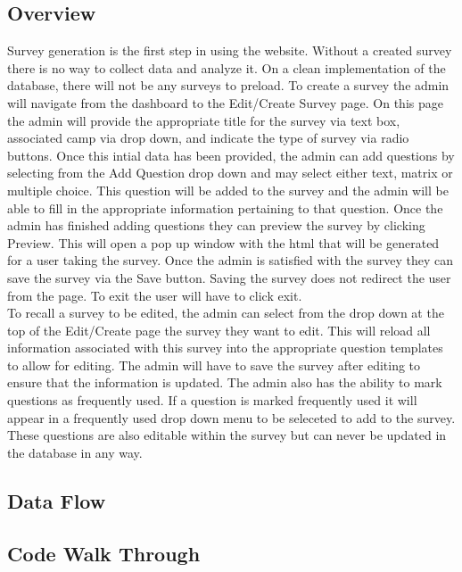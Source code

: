 \documentclass[../final.tex]{subfiles}
\begin{document}
\subsection{Overview}
Survey generation is the first step in using the website. Without a created 
survey there is no way to collect data and analyze it. On a clean implementation 
of the database, there will not be any surveys to preload. To create a survey the 
admin will navigate from the dashboard to the Edit/Create Survey page. On this page 
the admin will provide the appropriate title for the survey via text box, associated 
camp via drop down, and indicate the type of survey via radio buttons. Once this 
intial data has been provided, the admin can add questions by selecting from the 
Add Question drop down and may select either text, matrix or multiple choice. This 
question will be added to the survey and the admin will be able to fill in the 
appropriate information pertaining to that question. Once the admin has finished adding 
questions they can preview the survey by clicking Preview. This will open a pop up 
window with the html that will be generated for a user taking the survey. Once the admin 
is satisfied with the survey they can save the survey via the Save button. Saving the 
survey does not redirect the user from the page. To exit the user will have to click 
exit. \\
To recall a survey to be edited, the admin can select from the drop down at the top 
of the Edit/Create page the survey they want to edit. This will reload all information 
associated with this survey into the appropriate question templates to allow for 
editing. The admin will have to save the survey after editing to ensure that the 
information is updated. The admin also has the ability to mark questions as frequently 
used. If a question is marked frequently used it will appear in a frequently used 
drop down menu to be seleceted to add to the survey. These questions are also editable 
within the survey but can never be updated in the database in any way. \\ 
\subsection{Data Flow}
\subsection{Code Walk Through}
\end{document}
